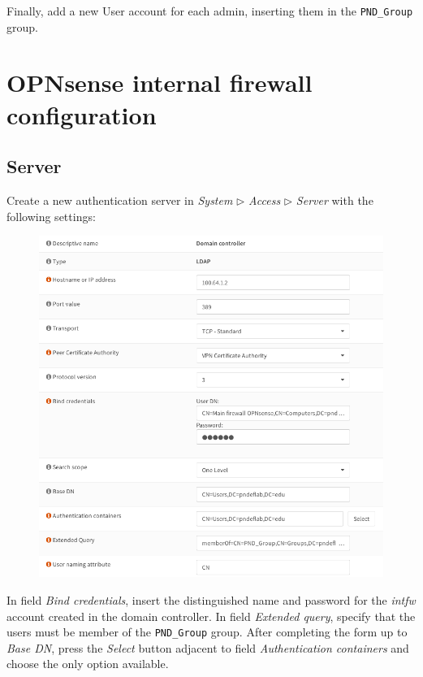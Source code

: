\documentclass{homework}
\newcommand{\opn}{OPNsense\xspace}
\newcommand{\intfw}{\textit{intfw}\xspace}
\begin{document}
    Finally, add a new User account for each admin, inserting them in the \texttt{PND\_Group} group.
    
    
    \section{\opn internal firewall configuration}
    \subsection{Server}
    Create a new authentication server in \textit{System} $\triangleright$ \textit{Access} $\triangleright$ \textit{Server} with the following settings:
    \begin{figure}[H]
        \centering
        \includegraphics[width=\linewidth]{images/server}
        \label{fig:server}
    \end{figure}
    \vspace{-10pt}

    In field \textit{Bind credentials}, insert the distinguished name and password for the \intfw account created in the domain controller.
    In field \textit{Extended query}, specify that the users must be member of the \texttt{PND\_Group} group.
    After completing the form up to \textit{Base DN}, press the \textit{Select} button adjacent to field \textit{Authentication containers} and choose the only option available.
    
\end{document}
